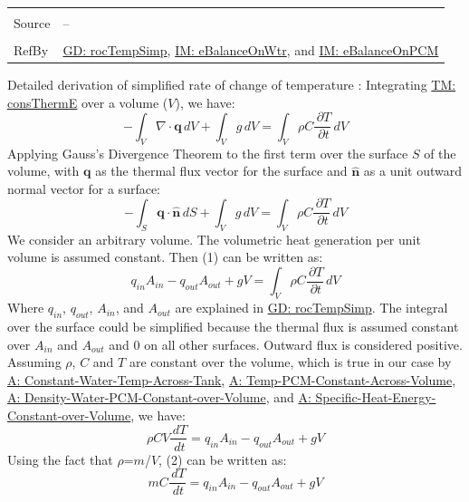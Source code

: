 \documentclass[12pt]{article}
\begin{document}
\begin{minipage}{\textwidth}
\begin{tabular}{p{} p{}}
\\ \midrule \\
Source & --
\\ \midrule \\
RefBy & \hyperref[GD:rocTempSimp]{GD: rocTempSimp}, \hyperref[IM:eBalanceOnWtr]{IM: eBalanceOnWtr}, and \hyperref[IM:eBalanceOnPCM]{IM: eBalanceOnPCM}
\\ \bottomrule \end{tabular}
\end{minipage}
Detailed derivation of simplified rate of change of temperature :
Integrating \hyperref[TM:consThermE]{TM: consThermE} over a volume ($V$), we have:
\begin{displaymath}
-\int_{V}{∇\cdot{}\mathbf{q}}\,dV+\int_{V}{g}\,dV=\int_{V}{ρ C \frac{\,\partial{}T}{\,\partial{}t}}\,dV
\end{displaymath}
Applying Gauss's Divergence Theorem to the first term over the surface $S$ of the volume, with $\mathbf{q}$ as the thermal flux vector for the surface and $\mathbf{\hat{n}}$ as a unit outward normal vector for a surface:
\begin{displaymath}
-\int_{S}{\mathbf{q}\cdot{}\mathbf{\hat{n}}}\,dS+\int_{V}{g}\,dV=\int_{V}{ρ C \frac{\,\partial{}T}{\,\partial{}t}}\,dV
\end{displaymath}
We consider an arbitrary volume. The volumetric heat generation per unit volume is assumed constant. Then (1) can be written as:
\begin{displaymath}
{q_{in}} {A_{in}}-{q_{out}} {A_{out}}+g V=\int_{V}{ρ C \frac{\,\partial{}T}{\,\partial{}t}}\,dV
\end{displaymath}
Where ${q_{in}}$, ${q_{out}}$, ${A_{in}}$, and ${A_{out}}$ are explained in \hyperref[GD:rocTempSimp]{GD: rocTempSimp}. The integral over the surface could be simplified because the thermal flux is assumed constant over ${A_{in}}$ and ${A_{out}}$ and $0$ on all other surfaces. Outward flux is considered positive. Assuming $ρ$, $C$ and $T$ are constant over the volume, which is true in our case by \hyperref[assumpCWTAT]{A: Constant-Water-Temp-Across-Tank}, \hyperref[assumpTPCAV]{A: Temp-PCM-Constant-Across-Volume}, \hyperref[assumpDWPCoV]{A: Density-Water-PCM-Constant-over-Volume}, and \hyperref[assumpSHECov]{A: Specific-Heat-Energy-Constant-over-Volume}, we have:
\begin{displaymath}
ρ C V \frac{\,dT}{\,dt}={q_{in}} {A_{in}}-{q_{out}} {A_{out}}+g V
\end{displaymath}
Using the fact that $ρ$=$m$/$V$, (2) can be written as:
\begin{displaymath}
m C \frac{\,dT}{\,dt}={q_{in}} {A_{in}}-{q_{out}} {A_{out}}+g V
\end{displaymath}
\end{document}
